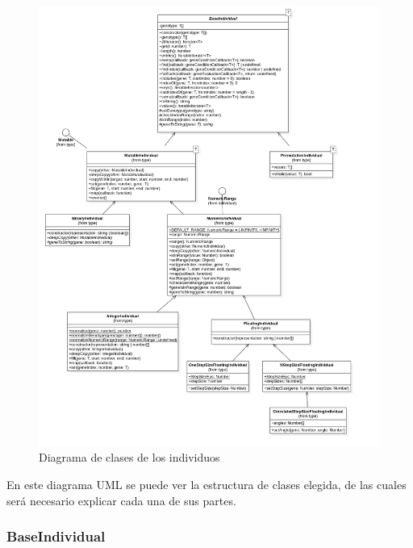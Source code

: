 \begin{figure}[ht]
    \centering
    \includegraphics[scale=0.2]{mem/images/cap-4/4.2.2(Individuos)/Individual.png}
    \caption{Diagrama de clases de los individuos}
    \label{fig:individuos}
\end{figure}

En este diagrama UML se puede ver la estructura de clases elegida, de las cuales será necesario explicar cada una de sus partes.

\subsubsection{BaseIndividual}

